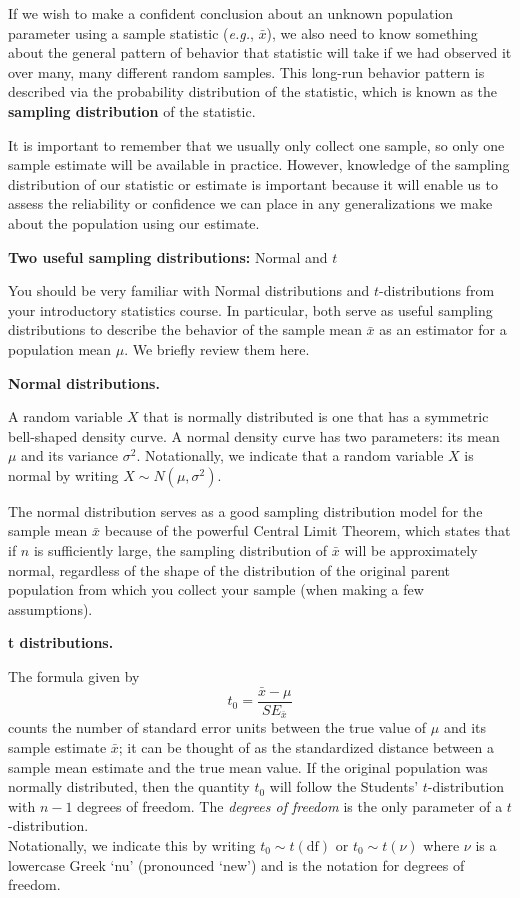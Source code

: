 \documentclass[
]{book}
\begin{document}
If we wish to make a confident conclusion about an unknown population parameter using a sample statistic (\emph{e.g.}, \(\bar{x}\)), we also need to know something about the general pattern of behavior that statistic will take if we had observed it over many, many different random samples.
This long-run behavior pattern is described via the probability distribution of the statistic, which is known as the \textbf{sampling distribution} of the statistic.

It is important to remember that we usually only collect one sample, so only one sample estimate will be available in practice.
However, knowledge of the sampling distribution of our statistic or estimate is important because it will enable us to assess the reliability or confidence we can place in any generalizations we make about the population using our estimate.

\textbf{Two useful sampling distributions:} Normal and \(t\)

You should be very familiar with Normal distributions and \(t\)-distributions from your introductory statistics course.
In particular, both serve as useful sampling distributions to describe the behavior of the sample mean \(\bar{x}\) as an estimator for a population mean \(\mu\). We briefly review them here.

\textbf{Normal distributions.}

A random variable \(X\) that is normally distributed is one that has a symmetric bell-shaped density curve.
A normal density curve has two parameters: its mean \(\mu\) and its variance \(\sigma^2\).
Notationally, we indicate that a random variable \(X\) is normal by writing \(X \sim N(\mu, \sigma^2)\).

The normal distribution serves as a good sampling distribution model for the sample mean \(\bar{x}\) because of the powerful Central Limit Theorem, which states that if \(n\) is sufficiently large, the sampling distribution of \(\bar{x}\) will be approximately normal, regardless of the shape of the distribution of the original parent population from which you collect your sample (when making a few assumptions).

\textbf{t distributions.}

The formula given by
\[t_0 = \frac{\bar{x}-\mu}{{SE}_{\bar{x}}}\]
counts the number of standard error units between the true value of \(\mu\) and its sample estimate \(\bar{x}\); it can be thought of as the standardized distance between a sample mean estimate and the true mean value.
If the original population was normally distributed, then the quantity \(t_0\) will follow the Students' \(t\)-distribution with \(n - 1\) degrees of freedom.
The \emph{degrees of freedom} is the only parameter of a \(t\)-distribution.\\
Notationally, we indicate this by writing \(t_0 \sim t(\textrm{df})\) or \(t_0 \sim t(\nu)\) where \(\nu\) is a lowercase Greek `nu' (pronounced `new') and is the notation for degrees of freedom.
\end{document}
